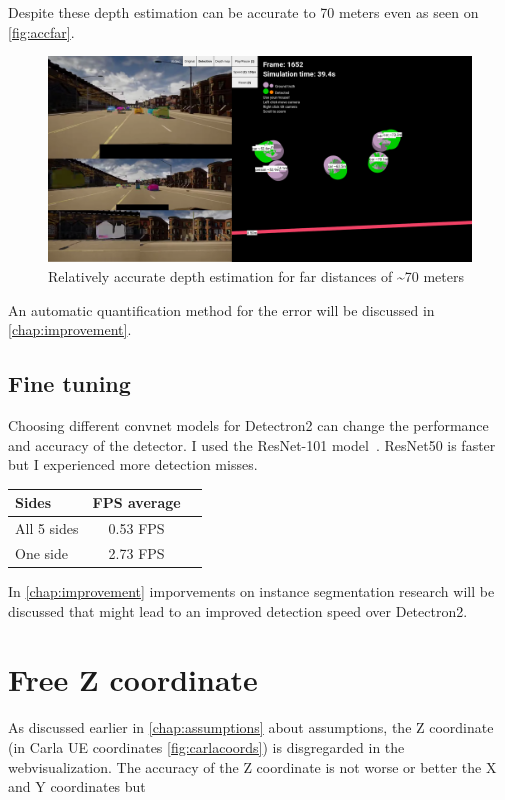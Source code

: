 Despite these depth estimation can be accurate to 70 meters even as seen on \autoref{fig:accfar}.
\begin{figure}[!ht]
	\centering
	\includegraphics[width=150mm, keepaspectratio]{figures/accfar.png}
	\caption{Relatively accurate depth estimation for far distances of \textasciitilde70 meters}
	\label{fig:accfar}
\end{figure}

An automatic quantification method for the error will be discussed in \autoref{chap:improvement}.

\subsection{Fine tuning}
Choosing different convnet models for Detectron2 can change the performance and
accuracy of the detector. I used the ResNet-101
model~\cite{DBLP:journals/corr/HeZRS15}. ResNet50 is faster but I experienced
more detection misses.

\begin{table}[ht]
	\footnotesize
	\centering
	\begin{tabular}{ l c c }
		\toprule
		Sides       & FPS average \\
		\midrule
		All 5 sides & 0.53 FPS    \\
		One side    & 2.73 FPS    \\
		\bottomrule
	\end{tabular}
	\label{tab:TabularExample}
\end{table}

In \autoref{chap:improvement} imporvements on instance segmentation research
will be discussed that might lead to an improved detection speed over
Detectron2.

\section{Free Z coordinate}
As discussed earlier in \autoref{chap:assumptions} about assumptions, the Z
coordinate (in Carla UE coordinates \autoref{fig:carlacoords}) is disgregarded
in the webvisualization. The accuracy of the Z coordinate is not worse or better
the X and Y coordinates but 

